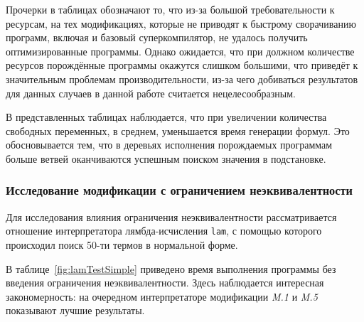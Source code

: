 Прочерки в таблицах обозначают то, что из-за большой требовательности к ресурсам,
на тех модификациях, которые не приводят к быстрому сворачиванию программ,
включая и базовый суперкомпилятор, не удалось получить оптимизированные программы.
Однако ожидается,
что при должном количестве ресурсов порождённые программы окажутся слишком большими,
что приведёт к значительным проблемам производительности, из-за чего добиваться
результатов
для данных случаев в данной работе считается нецелесообразным.

В представленных таблицах наблюдается, что при увеличении количества свободных переменных,
в среднем, уменьшается время генерации формул. Это обосновывается тем, что в
деревьях исполнения порождаемых программам больше ветвей оканчиваются успешным
поиском значения в подстановке.



\subsubsection{Исследование модификации с ограничением неэквивалентности}

Для исследования влияния ограничения неэквивалентности рассматривается отношение
интерпретатора лямбда-исчисления \lstinline{lam}, с помощью которого
происходил поиск 50-ти термов в нормальной форме.

В таблице~\ref{fig:lamTestSimple} приведено время выполнения программы
без введения ограничения неэквивалентности. Здесь наблюдается интересная закономерность:
на очередном интерпретаторе модификации {\it M.1} и {\it M.5} показывают лучшие результаты.

